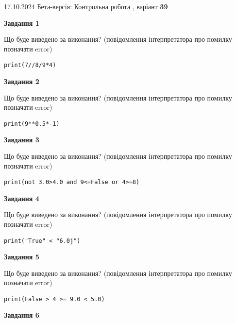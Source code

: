 \documentclass[12pt, ukrainian]{article}
\begin{document}
{\Large{17.10.2024 Бета-версія: Контрольна робота , варіант  \No \textbf { 39 }\par}}
{
\begin {large}
{\begin {center}\textbf{Завдання 1}\end {center}}

Що буде виведено за виконання? (повідомлення інтерпретатора про помилку позначати error)\par
\begin{verbatim}
print(7//8/9*4)
\end{verbatim}

{\begin {center}\textbf{Завдання 2}\end {center}}

Що буде виведено за виконання? (повідомлення інтерпретатора про помилку позначати error)\par
\begin{verbatim}
print(9**0.5*-1)
\end{verbatim}

{\begin {center}\textbf{Завдання 3}\end {center}}

Що буде виведено за виконання? (повідомлення інтерпретатора про помилку позначати error)\par
\begin{verbatim}
print(not 3.0>4.0 and 9<=False or 4>=8)
\end{verbatim}

{\begin {center}\textbf{Завдання 4}\end {center}}

Що буде виведено за виконання? (повідомлення інтерпретатора про помилку позначати error)\par
\begin{verbatim}
print("True" < "6.0j")
\end{verbatim}

{\begin {center}\textbf{Завдання 5}\end {center}}

Що буде виведено за виконання? (повідомлення інтерпретатора про помилку позначати error)\par
\begin{verbatim}
print(False > 4 >= 9.0 < 5.0)
\end{verbatim}

{\begin {center}\textbf{Завдання 6}\end {center}}


\end{large}}
\end{document}
